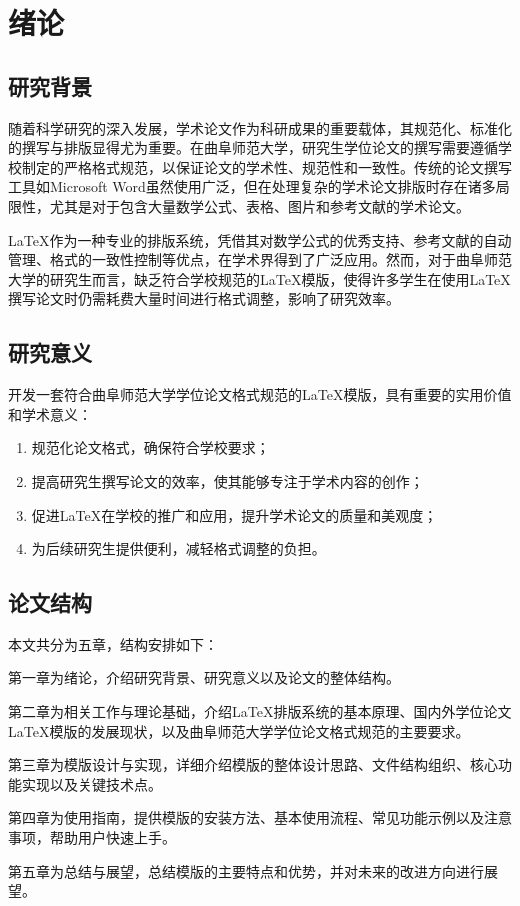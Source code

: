 \section{绪论}

\subsection{研究背景}
随着科学研究的深入发展，学术论文作为科研成果的重要载体，其规范化、标准化的撰写与排版显得尤为重要。在曲阜师范大学，研究生学位论文的撰写需要遵循学校制定的严格格式规范，以保证论文的学术性、规范性和一致性。传统的论文撰写工具如Microsoft Word虽然使用广泛，但在处理复杂的学术论文排版时存在诸多局限性，尤其是对于包含大量数学公式、表格、图片和参考文献的学术论文。

\LaTeX{}作为一种专业的排版系统，凭借其对数学公式的优秀支持、参考文献的自动管理、格式的一致性控制等优点，在学术界得到了广泛应用。然而，对于曲阜师范大学的研究生而言，缺乏符合学校规范的\LaTeX{}模版，使得许多学生在使用\LaTeX{}撰写论文时仍需耗费大量时间进行格式调整，影响了研究效率。

\subsection{研究意义}
开发一套符合曲阜师范大学学位论文格式规范的\LaTeX{}模版，具有重要的实用价值和学术意义：

\begin{enumerate}
    \item 规范化论文格式，确保符合学校要求；
    \item 提高研究生撰写论文的效率，使其能够专注于学术内容的创作；
    \item 促进\LaTeX{}在学校的推广和应用，提升学术论文的质量和美观度；
    \item 为后续研究生提供便利，减轻格式调整的负担。
\end{enumerate}

\subsection{论文结构}
本文共分为五章，结构安排如下：

第一章为绪论，介绍研究背景、研究意义以及论文的整体结构。

第二章为相关工作与理论基础，介绍\LaTeX{}排版系统的基本原理、国内外学位论文\LaTeX{}模版的发展现状，以及曲阜师范大学学位论文格式规范的主要要求。

第三章为模版设计与实现，详细介绍模版的整体设计思路、文件结构组织、核心功能实现以及关键技术点。

第四章为使用指南，提供模版的安装方法、基本使用流程、常见功能示例以及注意事项，帮助用户快速上手。

第五章为总结与展望，总结模版的主要特点和优势，并对未来的改进方向进行展望。
